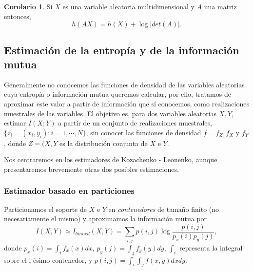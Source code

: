 \documentclass[10pt,a4paper]{article} %
\let\mathbb\relax
\theoremstyle{definition}
\newtheorem{theorem}{Teorema}[section]
\newtheorem{corollary}{Corolario}[theorem]
\begin{document}
\begin{corollary}
  Si $X$ es una variable aleatoria multidimensional y $A$ una matriz entonces,\[
h(AX) = h(X) + \log|det(A)|.
  \]
\end{corollary}



\subsection{Estimación de la entropía y de la información mutua}

Generalmente no conocemos las funciones de densidad de las variables aleatorias cuya entropía o información mutua queremos calcular, por ello, tratamos de aproximar este valor a partir de información que sí conocemos, como realizaciones muestrales de las variables. El objetivo es, para dos variables aleatorias $X,Y$, estimar $I(X;Y)$ a partir de un conjunto de realizaciones muestrales, $\{z_i=(x_i,y_i) : i = 1,\cdots, N\}$, sin conocer las funciones de densidad $f=f_Z, f_X$ y $f_Y$, donde $Z = (X,Y$ es la distribución conjunta de $X$ e $Y$.

Nos centraremos en los estimadores de Kozachenko - Leonenko, aunque presentaremos brevemente otras dos posibles estimaciones.

\subsubsection{Estimador basado en particiones}

Particionamos el soporte de $X$ e $Y$ en \textit{contenedores} de tamaño finito (no necesariamente el mismo) y aproximamos la información mutua por \[
I(X,Y) \approx I_{\textit{binned}}(X,Y) = \sum_{i,j} p(i,j) \log \frac{p(i,j)}{p_x(i)p_y(j)},
\]
donde $p_x(i) = \int_i f_x(x)dx$, $p_y(j) = \int_j f_y(y)dy$, $\int_i$ representa la integral sobre el i-ésimo contenedor, y $p(i,j) = \int_i\int_jf(x,y)dxdy$.
\end{document}
